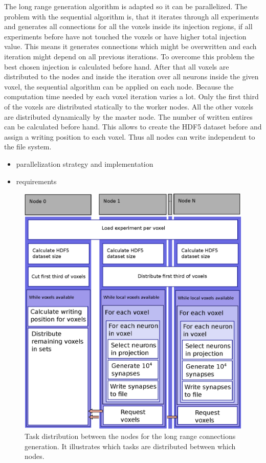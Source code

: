 The long range generation algorithm is adapted so it can be parallelized.
The problem with the sequential algorithm is, that it iterates through all experiments
and generates all connections for all the voxels inside its injection regions, if 
all experiments before have not touched the voxels or have higher total injection
value. This means it generates connections which might be overwritten and each iteration might depend
on all previous iterations. To overcome this problem the best chosen injection is calculated before hand.
After that all voxels are distributed to the nodes and inside the iteration over all neurons
inside the given voxel, the sequential algorithm can be applied on each node.
Because the computation time needed by each voxel iteration varies a lot. Only the first third
of the voxels are distributed statically to the worker nodes.
All the other voxels are distributed dynamically by the master node.
The number of written entires can be calculated before hand. This allows to create
the HDF5 dataset before and assign a writing position to each voxel.
Thus all nodes can write independent to the file system.

\begin{itemize}
      \item parallelization strategy and implementation
      \item requirements 
\end{itemize}

\begin{figure}[ht!]
\centering
\includegraphics[scale=0.5]{pictures/longRange_parallelAlg.eps}
\caption{Task distribution between the nodes for the long range connections generation. It illustrates which tasks are distributed between which nodes.}
\end{figure}

